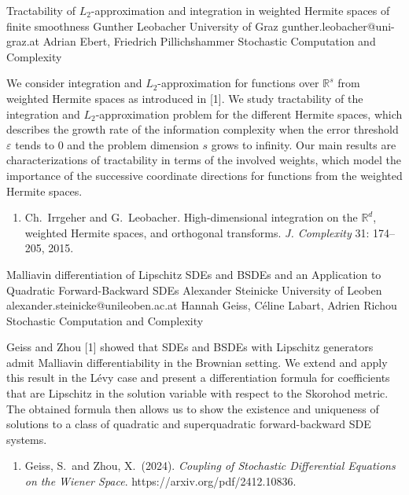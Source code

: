 \begin{talk}
  {Tractability of $L_2$-approximation and integration in weighted Hermite spaces of finite smoothness}%
  {Gunther Leobacher}%
  {University of Graz}%
  {gunther.leobacher@uni-graz.at}%
  {Adrian Ebert, Friedrich Pillichshammer}%
  {Stochastic Computation and Complexity}%
    
   

We consider integration and $L_2$-approximation for functions over $\mathbb R^s$ from weighted Hermite spaces as introduced in [1]. We study tractability of the integration and $L_2$-approximation problem for the different Hermite spaces, which describes the growth rate of the information complexity when the error threshold $\varepsilon$ tends to 0 and the problem dimension $s$ grows to infinity. Our main results are characterizations of tractability in terms of the involved weights, which  model the importance of the successive coordinate directions for functions from the weighted Hermite spaces.

\medskip

\begin{enumerate}
 \item[{[1]}] Ch.~Irrgeher and G.~Leobacher. High-dimensional integration on the $\mathbb R^d$, weighted Hermite spaces, and orthogonal transforms. \textit{J. Complexity} 31: 174--205, 2015. 
\end{enumerate}


\end{talk}

\begin{talk}
  {Malliavin differentiation of Lipschitz SDEs and BSDEs and an Application to Quadratic Forward-Backward SDEs}%
  {Alexander Steinicke}%
  {University of Leoben}%
  {alexander.steinicke@unileoben.ac.at}%
  {Hannah Geiss, C\'eline Labart, Adrien Richou}%
  {Stochastic Computation and Complexity}%
    
   
Geiss and Zhou [1] showed that SDEs and BSDEs with Lipschitz generators admit Malliavin differentiability in the Brownian setting. We extend and apply this result in the L\'evy case and present a differentiation formula for coefficients that are Lipschitz in the solution variable with respect to the Skorohod metric. The obtained formula then allows us to show the existence and uniqueness of solutions to a class of quadratic and superquadratic forward-backward SDE systems.

\medskip

\begin{enumerate}
 \item[{[1]}] Geiss, S.~and Zhou, X.~(2024). {\it Coupling of Stochastic Differential Equations on the Wiener Space}. https://arxiv.org/pdf/2412.10836.
\end{enumerate}

\end{talk}

